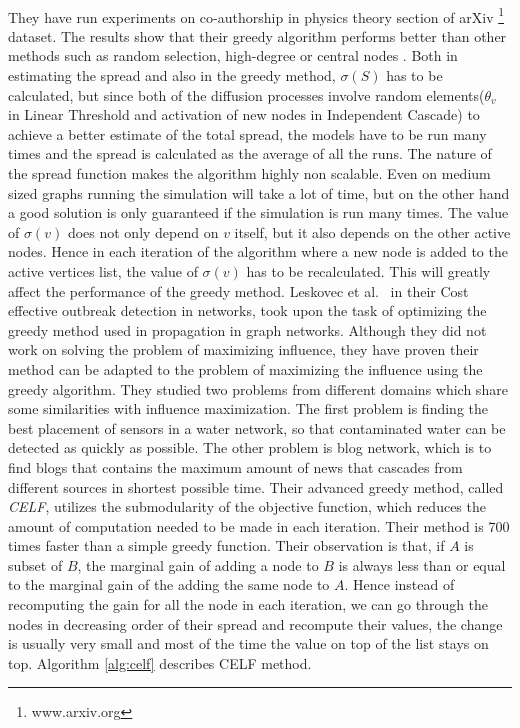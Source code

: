 \documentclass[english]{tktltiki}
\begin{document}
\\
They have run experiments on co-authorship in physics theory section of arXiv \footnote{www.arxiv.org} dataset. The results show that their greedy algorithm performs better than other methods such as random selection, high-degree or central nodes .
Both in estimating the spread and also in the greedy method, $\sigma(S)$ has to be calculated, but since both of the diffusion processes involve random elements($\theta_v$ in Linear Threshold and activation of new nodes in Independent Cascade) to achieve a better estimate of the total spread, the models have to be run many times and the spread is calculated as the average of all the runs. The nature of the spread function makes the algorithm highly non scalable. Even on medium sized graphs running the simulation will take a lot of time, but on the other hand a good solution is only guaranteed if the simulation is run many times. The value of $\sigma(v)$ does not only depend on $v$ itself, but it also depends on the other active nodes. Hence in each iteration of the algorithm where a new node is added to the active vertices list, the value of $\sigma(v)$ has to be recalculated. This will greatly affect the performance of the greedy method.
Leskovec et al.\ \cite{leskovec07}  in their Cost effective outbreak detection in networks, took upon the task of optimizing the greedy method used in propagation in graph networks. Although they did not work on solving the problem of maximizing influence, they have proven their method can be adapted to the problem of maximizing the influence using the greedy algorithm. They studied two problems from different domains which share some similarities with influence maximization. The first problem is finding the best placement of sensors in a water network, so that contaminated water can be detected as quickly as possible. The other problem is blog network, which is to find blogs that contains the maximum amount of news that cascades from different sources in shortest possible time. Their advanced greedy method, called \textit{CELF}, utilizes the submodularity of the objective function, which reduces the amount of computation needed to be made in each iteration. Their method is 700 times faster than a simple greedy function. 
Their observation is that, if $A$ is subset of $B$, the marginal gain of adding a node to $B$ is always less than or equal to the marginal gain of the adding the same node to $A$. Hence instead of recomputing the gain for all the node in each iteration, we can go through the nodes in decreasing order of their spread and recompute their values, the change is usually very small and most of the time the value on top of the list stays on top. Algorithm \ref{alg:celf} describes CELF method.
\end{document}
